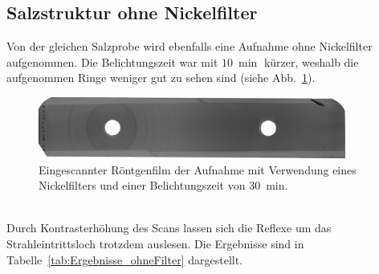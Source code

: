 \documentclass[a4paper,twoside,final]{article}
\begin{document}
\subsection{Salzstruktur ohne Nickelfilter}
Von der gleichen Salzprobe wird ebenfalls eine Aufnahme ohne Nickelfilter aufgenommen. Die Belichtungszeit war mit $\SI{10}{\min}$ kürzer, weshalb die aufgenommen Ringe weniger gut zu sehen sind (siehe Abb.~\ref{fig:Film_ohneFilter}).
\begin{figure}[htp]
    \centering
        \includegraphics[width=0.9\textwidth]{Abbildungen/Roentgenfilm_ohne_Filter.jpg}
    \caption{Eingescannter Röntgenfilm der Aufnahme mit Verwendung eines Nickelfilters und einer Belichtungszeit von \SI{30}{\minute}.}
    \label{fig:Film_ohneFilter}
\end{figure}\\
Durch Kontrasterhöhung des Scans lassen sich die Reflexe um das Strahleintrittsloch trotzdem auslesen. Die Ergebnisse sind in Tabelle~\ref{tab:Ergebnisse_ohneFilter} dargestellt.
\end{document}
